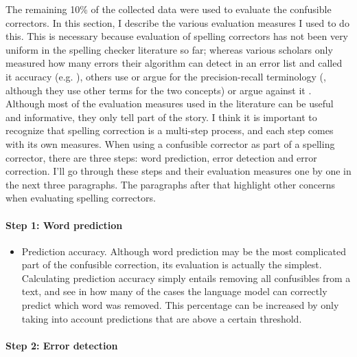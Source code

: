 \documentclass[12pt]{article}
\begin{document}
The remaining 10\% of the collected data were used to evaluate the confusible correctors. In this section, I describe the various evaluation measures I used to do this. This is necessary because evaluation of spelling correctors has not been very uniform in the spelling checker literature so far; whereas various scholars only measured how many errors their algorithm can detect in an error list and called it accuracy (e.g. \citealp{agirre98, bm00, tm02,vandelden04}), others use or argue for the precision-recall terminology (\citealp{reynaert08,pz84}, although they use other terms for the two concepts) or argue against it \citep{sp02}.\\\indent
Although most of the evaluation measures used in the literature can be useful and informative, they only tell part of the story. I think it is important to recognize that spelling correction is a multi-step process, and each step comes with its own measures. When using a confusible corrector as part of a spelling corrector, there are three steps: word prediction, error detection and error correction. I'll go through these steps and their evaluation measures one by one in the next three paragraphs. The paragraphs after that highlight other concerns when evaluating spelling correctors.

\paragraph{Step 1: Word prediction}

\begin{itemize}
\item Prediction accuracy. Although word prediction may be the most complicated part of the confusible correction, its evaluation is actually the simplest. Calculating prediction accuracy simply entails removing all confusibles from a text, and see in how many of the cases the language model can correctly predict which word was removed. This percentage can be increased by only taking into account predictions that are above a certain threshold. 
\end{itemize}

\paragraph{Step 2: Error detection}
\end{document}
